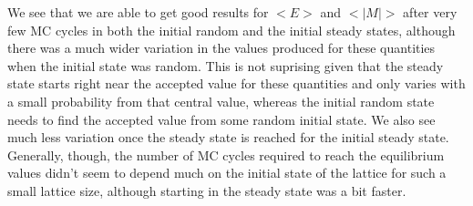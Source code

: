 \documentclass[12pt]{article}
\numberwithin{equation}{section}
\begin{document}
\par We see that we are able to get good results for $<E>$ and $<|M|>$ after very few MC cycles in both the initial random and the initial steady states, although there was a much wider variation in the values produced for these quantities when the initial state was random.  This is not suprising given that the steady state starts right near the accepted value for these quantities and only varies with a small probability from that central value, whereas the initial random state needs to find the accepted value from some random initial state.  We also see much less variation once the steady state is reached for the initial steady state.  Generally, though, the number of MC cycles required to reach the equilibrium values didn't seem to depend much on the initial state of the lattice for such a small lattice size, although starting in the steady state was a bit faster.  
\end{document}
